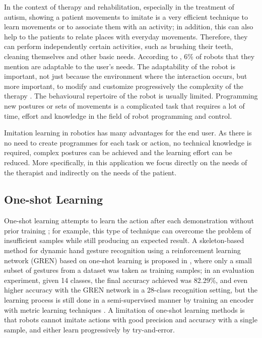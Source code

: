 \documentclass[thesis]{mas_proposal}
\begin{document}
    In the context of therapy and rehabilitation, especially in the treatment of autism, showing a patient movements to imitate is a very efficient technique to learn movements or to associate them with an activity; in addition, this can also help to the patients to relate places with everyday movements. Therefore, they can perform independently certain activities, such as brushing their teeth, cleaning themselves and other basic needs. According to \cite{Cabibihan2013}, 6\% of robots that they mention are adaptable to the user's needs. The adaptability of the robot is important, not just because the environment where the interaction occurs, but more important, to modify and customize progressively the complexity of the therapy \cite{Dickstein2018}. The behavioural repertoire of the robot is usually limited. Programming new postures or sets of movements is a complicated task that requires a lot of time, effort and knowledge in the field of robot programming and control.
    
    Imitation learning in robotics has many advantages for the end user. As there is no need to create programmes for each task or action, no technical knowledge is required, complex postures can be achieved and the learning effort can be reduced. More specifically, in this application we focus directly on the needs of the therapist \cite{Ravichandar2020, Kulikovskiy2021} and indirectly on the needs of the patient. 	
    
    \subsection{One-shot Learning}
    
    One-shot learning attempts to learn the action after each demonstration without prior training \cite{Yan2010}; for example, this type of technique can overcome the problem of insufficient samples while still producing an expected result. A skeleton-based method for dynamic hand gesture recognition using a reinforcement learning network (GREN) based on one-shot learning is proposed in \cite{Chunyong2020}, where only a small subset of gestures from a dataset was taken as training samples; in an evaluation experiment, given 14 classes, the final accuracy achieved was 82.29\%, and even higher accuracy with the GREN network in a 28-class recognition setting, but the learning process is still done in a semi-supervised manner by training an encoder with metric learning techniques \cite{Sabater2021}. A limitation of one-shot learning methods is that robots cannot imitate actions with good precision and accuracy with a single sample, and either learn progressively by try-and-error.
    
\end{document}
